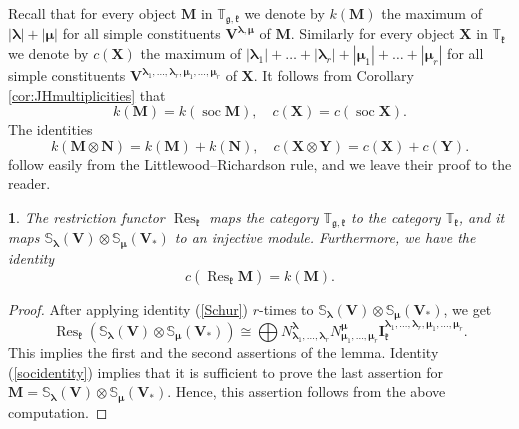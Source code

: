 \documentclass[12pt,oneside,english]{amsart}
\numberwithin{equation}{section}
\numberwithin{figure}{section}
\theoremstyle{plain}
\theoremstyle{plain}
\newtheorem{lem}[thm]{\protect\lemmaname}
\theoremstyle{remark}
\theoremstyle{definition}
\theoremstyle{plain}
\theoremstyle{remark}
\theoremstyle{definition}
\theoremstyle{plain}
\theoremstyle{plain}
\theoremstyle{definition}
\providecommand{\lemmaname}{Lemma}
\newcommand{\bV}{\mathbf{V}}
\newcommand{\bX}{\mathbf{X}}
\newcommand{\bY}{\mathbf{Y}}
\newcommand{\bI}{\mathbf{I}}
\newcommand{\bM}{\mathbf{M}}
\newcommand{\bN}{\mathbf{N}}
\newcommand{\soc}{\operatorname{soc}}
\newcommand{\fg}{\mathfrak{g}}
\newcommand{\fk}{\mathfrak{k}}
\newcommand{\Res}{\operatorname{Res}}
\begin{document}
    Recall that for every object $\bM$ in $ \mathbb T_{\fg,\fk}$ we denote by $k(\bM)$ the maximum of $|\boldsymbol{\lambda}|+|{\boldsymbol{\mu}}|$ for all simple constituents
    $\bV^{\boldsymbol{\lambda},{\boldsymbol{\mu}}}$ of $\bM$. Similarly for every object $\bX$ in $ \mathbb T_{\fk}$ we denote by $c(\bX)$ the maximum of
    $|\boldsymbol{\lambda}_1|+\dots+|\boldsymbol{\lambda}_r|+|{\boldsymbol{\mu}}_1|+\dots+|{\boldsymbol{\mu}}_r|$ for all simple constituents $\bV^{\boldsymbol{\lambda}_1,\dots,\boldsymbol{\lambda}_r,{\boldsymbol{\mu}}_1,\dots,{\boldsymbol{\mu}}_r}$ of $\bX$.
    It follows from Corollary \ref{cor:JHmultiplicities} that
\begin{equation}\label{socidentity}
  k(\bM)=k(\soc \bM),\quad c(\bX)=c(\soc \bX).
\end{equation}
The  identities
\begin{equation}\label{tensidentity}
  k(\bM\otimes \bN)=k(\bM)+k(\bN),\quad c(\bX\otimes \bY)=c(\bX)+c(\bY).
\end{equation}
 follow easily from the Littlewood--Richardson rule, and we leave their proof to the reader.

   \begin{lem}\label{lem:restriction} The restriction functor $\Res_{\fk}$ maps the category $ \mathbb T_{\fg,\fk}$ to the category $\mathbb T_{\fk}$, and it
      maps $\mathbb{S}_{\boldsymbol{\lambda}}(\bV)\otimes \mathbb{S}_{{\boldsymbol{\mu}}}(\bV_*)$ to an injective module. Furthermore, we have the identity
      $$c(\Res_{\fk}\bM)=k(\bM).$$
    \end{lem}
    \begin{proof} After applying identity (\ref{Schur}) $r$-times to $\mathbb{S}_{\boldsymbol{\lambda}}(\bV)\otimes \mathbb{S}_{{\boldsymbol{\mu}}}(\bV_*)$,   we get
      $$\Res_{\fk}(\mathbb{S}_{\boldsymbol{\lambda}}(\bV)\otimes \mathbb{S}_{{\boldsymbol{\mu}}}(\bV_*))\cong\bigoplus N^{\boldsymbol{\lambda}}_{\boldsymbol{\lambda}_1,\dots,\boldsymbol{\lambda}_r}N^{{\boldsymbol{\mu}}}_{{\boldsymbol{\mu}}_1,\dots,{\boldsymbol{\mu}}_r}\bI_{\fk}^{\boldsymbol{\lambda}_1,\dots,\boldsymbol{\lambda}_r,{\boldsymbol{\mu}}_1,\dots,{\boldsymbol{\mu}}_r}.$$
      This implies the first and the second assertions of the lemma. Identity  (\ref{socidentity}) implies that it
      is sufficient to prove the last assertion for $\bM=\mathbb{S}_{\boldsymbol{\lambda}}(\bV)\otimes \mathbb{S}_{{\boldsymbol{\mu}}}(\bV_*)$. Hence, this assertion follows from the above computation.
    \end{proof}
\end{document}
